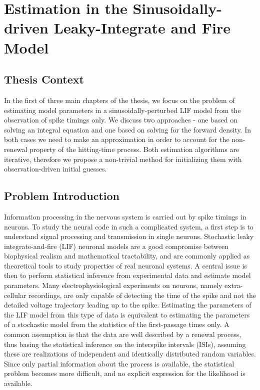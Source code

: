 \chapter{Estimation in the Sinusoidally-driven Leaky-Integrate and Fire Model}
\label{ch:estimate}
\graphicspath{{../LIFEPaper/}}

   
\section{Thesis Context}
 In the first of three main chapters of the thesis, we focus on the problem of
 estimating model parameters in a sinusoidally-perturbed LIF model from the
 observation of spike timings only. We discuss two approaches - one based on
 solving an integral equation and one based on solving for the forward density.
 In both cases we need to make an approximation in order to account for the
 non-renewal property of the hitting-time process. 
Both estimation algorithms are iterative, therefore we propose a non-trivial
 method for initializing them with observation-driven initial guesses.  
 
\section{Problem Introduction} 
Information processing in the nervous system is carried out by spike timings in
neurons. To study the neural code in such a complicated system, a first step is
to understand signal processing and transmission in single neurons. Stochastic
leaky integrate-and-fire (LIF) neuronal models are a good compromise between
biophysical realism and mathematical tractability, and are commonly applied as
theoretical tools to study properties of real neuronal systems. A central issue
is then to perform statistical inference from experimental data and estimate
model parameters. Many electrophysiological experiments on neurons, namely
extra-cellular recordings, are only capable of detecting the time of the spike
and not the detailed voltage trajectory leading up to the spike. Estimating the
parameters of the LIF model from this type of data is equivalent to estimating
the parameters of a stochastic model from the statistics of the first-passage
times only. A common assumption is that the data are well described by a renewal
process, thus basing the statistical inference on the interspike intervals
(ISIs), assuming these are realizations of independent and identically
distributed random variables. Since only partial information about the process
is available, the statistical problem becomes more difficult, and no explicit
expression for the likelihood is available. 

